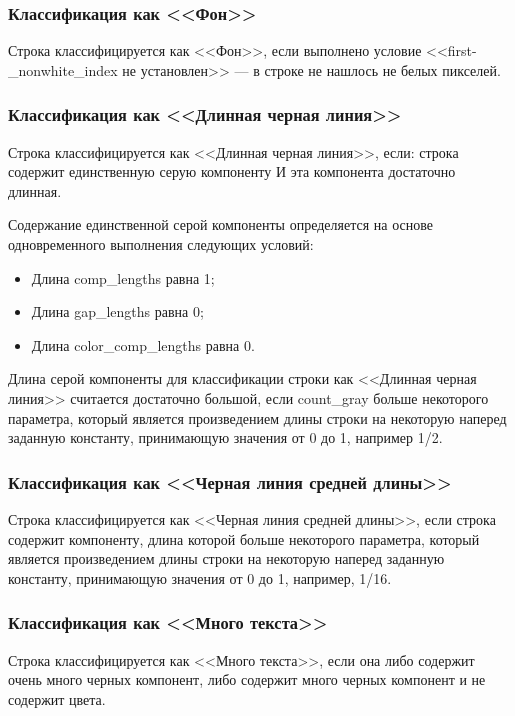 \subsubsection*{Классификация как <<Фон>>}

Строка классифицируется как <<Фон>>, если выполнено условие <<first-\_nonwhite\_index не установлен>> --- в строке не нашлось не белых пикселей.

\subsubsection*{Классификация как <<Длинная черная линия>>}

Строка классифицируется как <<Длинная черная линия>>, если: строка содержит единственную серую компоненту И эта компонента достаточно длинная.

Содержание единственной серой компоненты определяется на основе одновременного выполнения следующих условий:
\begin{itemize}
    \item Длина comp\_lengths равна 1;
    \item Длина gap\_lengths равна 0;
    \item Длина color\_comp\_lengths равна 0.
\end{itemize}

Длина серой компоненты для классификации строки как <<Длинная черная линия>> считается достаточно большой, если count\_gray больше некоторого параметра, который является произведением длины строки на некоторую наперед заданную константу, принимающую значения от 0 до 1, например 1/2.

\subsubsection*{Классификация как <<Черная линия средней длины>>}

Строка классифицируется как <<Черная линия средней длины>>, если строка содержит компоненту, длина которой больше некоторого параметра, который является произведением длины строки на некоторую наперед заданную константу, принимающую значения от 0 до 1, например, 1/16.

\subsubsection*{Классификация как <<Много текста>>}

Строка классифицируется как <<Много текста>>, если она либо содержит очень много черных компонент, либо содержит много черных компонент и не содержит цвета.

